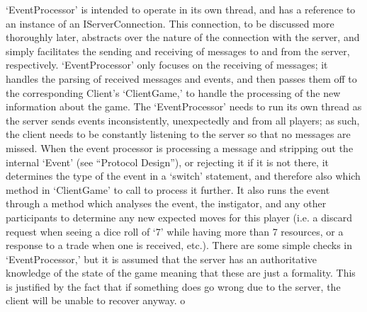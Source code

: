 \documentclass[a4paper,doc,draftfirst]{apa6}
\begin{document}
‘EventProcessor’ is intended to operate in its own thread, and has a reference to an instance of an IServerConnection. This connection, to be discussed more thoroughly later, abstracts over the nature of the connection with the server, and simply facilitates the sending and receiving of messages to and from the server, respectively. ‘EventProcessor’ only focuses on the receiving of messages; it handles the parsing of received messages and events, and then passes them off to the corresponding Client’s ‘ClientGame,’ to handle the processing of the new information about the game. The ‘EventProcessor’ needs to run its own thread as the server sends events inconsistently, unexpectedly and from all players; as such, the client needs to be constantly listening to the server so that no messages are missed. When the event processor is processing a message and stripping out the internal ‘Event’  (see “Protocol Design”), or rejecting it if it is not there, it determines the type of the event in a ‘switch’ statement, and therefore also which method in ‘ClientGame’ to call to process it further. It also runs the event through a method which analyses the event, the instigator, and any other participants to determine any new expected moves for this player (i.e. a discard request when seeing a dice roll of ‘7’ while having more than 7 resources, or a response to a trade when one is received, etc.). There are some simple checks in ‘EventProcessor,’ but it is assumed that the server has an authoritative knowledge of the state of the game meaning that these are just a formality. This is justified by the fact that if something does go wrong due to the server, the client will be unable to recover anyway. o
\end{document}
